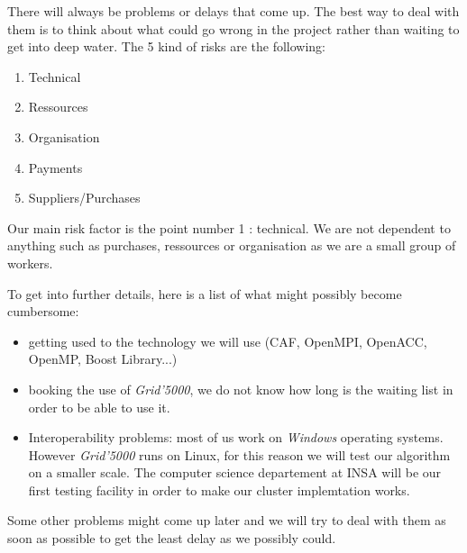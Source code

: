 There will always be problems or delays that come up. The best way to deal with them is to think about what could go wrong in the project rather than waiting to get into deep water. The 5 kind of risks are the following:
\begin{enumerate}
	\item Technical
	\item Ressources
	\item Organisation
	\item Payments
	\item Suppliers/Purchases
\end{enumerate}
Our main risk factor is the point number 1 : technical. We are not dependent to anything such as purchases, ressources or organisation as we are a small group of workers.

To get into further details, here is a list of what might possibly become cumbersome:
\begin{itemize}
	\item getting used to the technology we will use (CAF, OpenMPI, OpenACC, OpenMP, Boost Library...)
	\item booking the use of \textit{Grid'5000}, we do not know how long is the waiting list in order to be able to use it.
	\item Interoperability problems: most of us work on \textit{Windows} operating systems. However \textit{Grid'5000} runs on Linux, for this reason we will test our algorithm on a smaller scale. The computer science departement at INSA will be our first testing facility in order to make our cluster implemtation works.
\end{itemize}
Some other problems might come up later and we will try to deal with them as soon as possible to get the least delay as we possibly could.~\\
